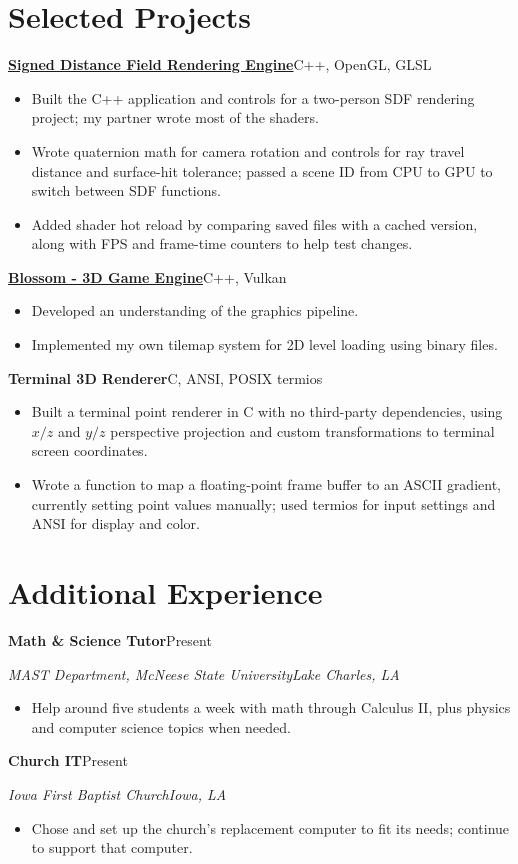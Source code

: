 \documentclass[11pt,letterpaper]{article}
\newcommand{\entry}[4]{%
  \textbf{#1}\hfill #2\par
  \textit{#3}\hfill \textit{#4}\par
}
\begin{document}
\section{Selected Projects}
\textbf{\href{https://github.com/daneboyd20001/SRPLightingEngine}{Signed Distance Field Rendering Engine}}\hfill C++, OpenGL, GLSL\par
\begin{itemize}
	\item Built the C++ application and controls for a two-person SDF rendering project; my partner wrote most of the shaders.
	\item Wrote quaternion math for camera rotation and controls for ray travel distance and surface-hit tolerance; passed a scene ID from CPU to GPU to switch between SDF functions.
	\item Added shader hot reload by comparing saved files with a cached version, along with FPS and frame-time counters to help test changes.
\end{itemize}
\vspace{2pt}
\textbf{\href{https://github.com/HunterLiles/blossom/tree/Vulkan}{Blossom - 3D Game Engine}}\hfill C++, Vulkan\par
\begin{itemize}
	\item Developed an understanding of the graphics pipeline.
	\item Implemented my own tilemap system for 2D level loading using binary files.
\end{itemize}
\vspace{2pt}
\textbf{Terminal 3D Renderer}\hfill C, ANSI, POSIX termios\par
\begin{itemize}
	\item Built a terminal point renderer in C with no third-party dependencies, using $x/z$ and $y/z$ perspective projection and custom transformations to terminal screen coordinates.
	\item Wrote a function to map a floating-point frame buffer to an ASCII gradient, currently setting point values manually; used termios for input settings and ANSI for display and color.
\end{itemize}

\section{Additional Experience}
\entry{Math \& Science Tutor}{Present}{MAST Department, McNeese State University}{Lake Charles, LA}
\begin{itemize}
	\item Help around five students a week with math through Calculus II, plus physics and computer science topics when needed.
\end{itemize}
\vspace{2pt}
\entry{Church IT}{Present}{Iowa First Baptist Church}{Iowa, LA}
\begin{itemize}
	\item Chose and set up the church's replacement computer to fit its needs; continue to support that computer.
\end{itemize}
\end{document}
